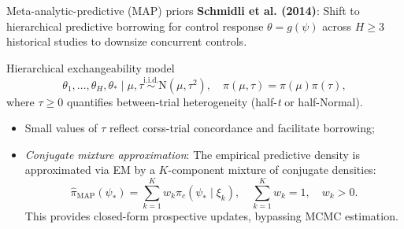 \documentclass[t]{beamer}
\begin{document}
\begin{frame}{Meta-analytic-predictive (MAP) priors}
    \vspace{-0.25cm}
    \textbf{Schmidli et al. (2014)}: Shift to hierarchical predictive borrowing for control response $\theta = g(\psi)$ across $H \ge 3$ historical studies to downsize concurrent controls.

    \begin{block}{Hierarchical exchangeability model}
    \begin{equation*}
        \theta_1, \dots, \theta_H, \theta_* \mid \mu, \tau \overset{\text{i.i.d.}}{\sim} \text{N}(\mu, \tau^2), \quad \pi(\mu, \tau) = \pi(\mu)\pi(\tau),
    \end{equation*}
    where $\tau \ge 0$ quantifies between-trial heterogeneity (half-\textit{t} or half-Normal).
    \end{block}

    \vspace{-0.18cm}
    \begin{itemize}
        \setlength{\itemsep}{0.04cm}
        \item Small values of $\tau$ reflect corss-trial concordance and facilitate borrowing;
        \item \emph{Conjugate mixture approximation}: The empirical predictive density is approximated via EM by a $K$-component mixture of conjugate densities:
        \begin{equation*}
            \hat\pi_{\text{MAP}}(\psi_*) = \sum_{k=1}^K w_k \pi_c(\psi_* \mid \xi_k), \quad \sum_{k=1}^K w_k = 1, \quad w_k > 0.
        \end{equation*}
        This provides closed-form prospective updates, bypassing MCMC estimation.
    \end{itemize}
\end{frame}
\end{document}
